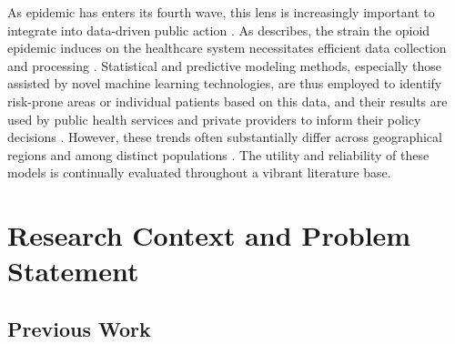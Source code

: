 \documentclass[journal]{IEEEtran}
\begin{document}
	As epidemic has enters its fourth wave, this lens is increasingly important to integrate into data-driven public action \cite{ciccaroneRiseIllicitFentanyls2021, juddOpioidEpidemicReview2023}. As \citeauthor{blancoDataNeedsModels2022} describes, the strain the opioid epidemic induces on the healthcare system necessitates efficient data collection and processing \cite{blancoDataNeedsModels2022}. Statistical and predictive modeling methods, especially those assisted by novel machine learning technologies, are thus employed to identify risk-prone areas or individual patients based on this data, and their results are used by public health services and private providers to inform their policy decisions \cite{blancoDataNeedsModels2022, sharmaAIDrivenPatientRisk2023}. However, these trends often substantially differ across geographical regions and among distinct populations \cite{wilkesDemographicRegionalComparison2021}. The utility and reliability of these models is continually evaluated throughout a vibrant literature base.

	\section{Research Context and Problem Statement}

	\subsection{Previous Work}
\end{document}
